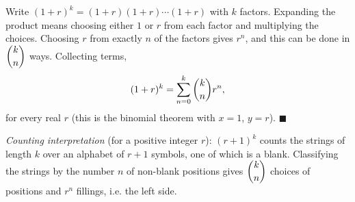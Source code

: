 Write $(1+r)^k=(1+r)(1+r)\cdots(1+r)$ with $k$ factors. Expanding the product means choosing either $1$ or $r$ from each factor and multiplying the choices. Choosing $r$ from exactly $n$ of the factors gives $r^n$, and this can be done in $\dbinom kn$ ways. Collecting terms,
\[(1+r)^k=\sum_{n=0}^{k}\dbinom kn r^n,\]
for every real $r$ (this is the binomial theorem with $x=1$, $y=r$). $\blacksquare$

\emph{Counting interpretation} (for a positive integer $r$): $(r+1)^k$ counts the strings of length $k$ over an alphabet of $r+1$ symbols, one of which is a blank. Classifying the strings by the number $n$ of non-blank positions gives $\dbinom kn$ choices of positions and $r^n$ fillings, i.e. the left side.
